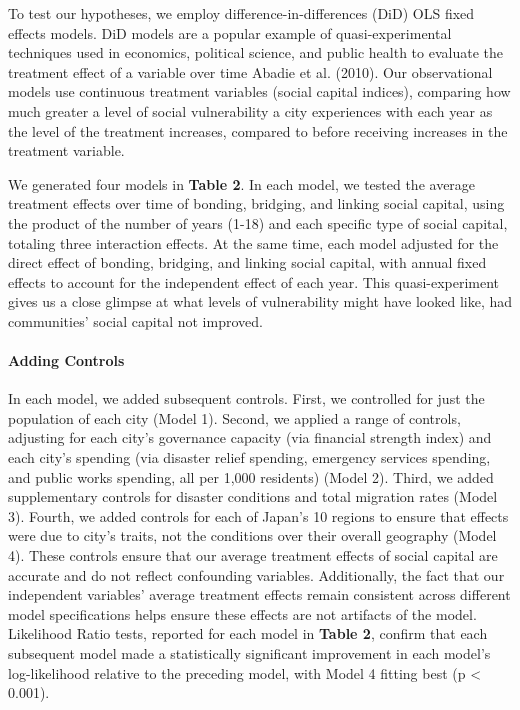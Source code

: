 \documentclass[]{elsarticle} %
\begin{document}
To test our hypotheses, we employ difference-in-differences (DiD) OLS
fixed effects models. DiD models are a popular example of
quasi-experimental techniques used in economics, political science, and
public health to evaluate the treatment effect of a variable over time
Abadie et al. (2010). Our observational models use continuous treatment
variables (social capital indices), comparing how much greater a level
of social vulnerability a city experiences with each year as the level
of the treatment increases, compared to before receiving increases in
the treatment variable.

We generated four models in \textbf{Table 2}. In each model, we tested
the average treatment effects over time of bonding, bridging, and
linking social capital, using the product of the number of years (1-18)
and each specific type of social capital, totaling three interaction
effects. At the same time, each model adjusted for the direct effect of
bonding, bridging, and linking social capital, with annual fixed effects
to account for the independent effect of each year. This
quasi-experiment gives us a close glimpse at what levels of
vulnerability might have looked like, had communities' social capital
not improved.

\hypertarget{adding-controls}{%
\paragraph{Adding Controls}\label{adding-controls}}

In each model, we added subsequent controls. First, we controlled for
just the population of each city (Model 1). Second, we applied a range
of controls, adjusting for each city's governance capacity (via
financial strength index) and each city's spending (via disaster relief
spending, emergency services spending, and public works spending, all
per 1,000 residents) (Model 2). Third, we added supplementary controls
for disaster conditions and total migration rates (Model 3). Fourth, we
added controls for each of Japan's 10 regions to ensure that effects
were due to city's traits, not the conditions over their overall
geography (Model 4). These controls ensure that our average treatment
effects of social capital are accurate and do not reflect confounding
variables. Additionally, the fact that our independent variables'
average treatment effects remain consistent across different model
specifications helps ensure these effects are not artifacts of the
model. Likelihood Ratio tests, reported for each model in \textbf{Table
2}, confirm that each subsequent model made a statistically significant
improvement in each model's log-likelihood relative to the preceding
model, with Model 4 fitting best (p \textless{} 0.001).
\end{document}
